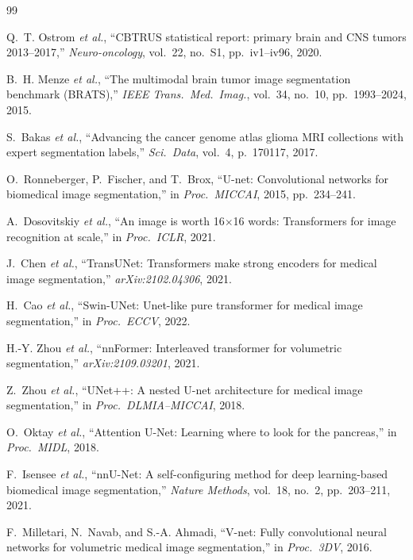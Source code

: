 \documentclass[10pt,twocolumn]{article}
\begin{document}
\balance
\begin{thebibliography}{99}

Q.~T. Ostrom \textit{et al.}, ``CBTRUS statistical report: primary brain and CNS tumors
2013--2017,'' \textit{Neuro-oncology}, vol.~22, no.~S1, pp.~iv1--iv96, 2020.

B.~H. Menze \textit{et al.}, ``The multimodal brain tumor image segmentation benchmark
(BRATS),'' \textit{IEEE Trans.\ Med.\ Imag.}, vol.~34, no.~10, pp.~1993--2024, 2015.

S.~Bakas \textit{et al.}, ``Advancing the cancer genome atlas glioma MRI collections
with expert segmentation labels,'' \textit{Sci.\ Data}, vol.~4, p.~170117, 2017.

O.~Ronneberger, P.~Fischer, and T.~Brox, ``U-net: Convolutional networks for
biomedical image segmentation,'' in \textit{Proc.\ MICCAI}, 2015, pp.~234--241.

A.~Dosovitskiy \textit{et al.}, ``An image is worth 16$\times$16 words: Transformers
for image recognition at scale,'' in \textit{Proc.\ ICLR}, 2021.

J.~Chen \textit{et al.}, ``TransUNet: Transformers make strong encoders for medical
image segmentation,'' \textit{arXiv:2102.04306}, 2021.

H.~Cao \textit{et al.}, ``Swin-UNet: Unet-like pure transformer for medical image
segmentation,'' in \textit{Proc.\ ECCV}, 2022.

H.-Y. Zhou \textit{et al.}, ``nnFormer: Interleaved transformer for volumetric
segmentation,'' \textit{arXiv:2109.03201}, 2021.

Z.~Zhou \textit{et al.}, ``UNet++: A nested U-net architecture for medical image
segmentation,'' in \textit{Proc.\ DLMIA--MICCAI}, 2018.

O.~Oktay \textit{et al.}, ``Attention U-Net: Learning where to look for the pancreas,''
in \textit{Proc.\ MIDL}, 2018.

F.~Isensee \textit{et al.}, ``nnU-Net: A self-configuring method for deep
learning-based biomedical image segmentation,''
\textit{Nature Methods}, vol.~18, no.~2, pp.~203--211, 2021.

F.~Milletari, N.~Navab, and S.-A. Ahmadi, ``V-net: Fully convolutional neural networks
for volumetric medical image segmentation,'' in \textit{Proc.\ 3DV}, 2016.


\end{thebibliography}
\end{document}
